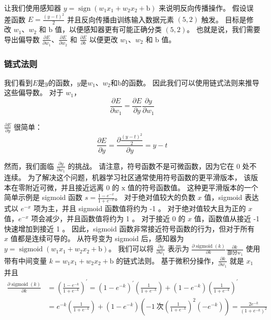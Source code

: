 让我们使用感知器 $y=\operatorname{sign}\left(w_{1} x_{1}+w_{2} x_{2}+\mathrm{b}\right)$ 来说明反向传播操作。 
假设误差函数 $E=\frac{(y-t)^{2}}{2}$ 并且反向传播由训练输入数据元素 $(5,2)$ 触发。 
目标是修改 $w_{1}、w_{2}$ 和 $\mathrm{b}$ 值，以便感知器更有可能正确分类 $(5,2)$。 
也就是说，我们需要导出偏导数 $\frac{\partial E}{\partial w_{1}}、\frac{\partial E}{\partial w_{2}}$ 
和 $\frac {\partial E}{\partial b}$ 以便更改 $w_{1}、w_{2}$ 和 $\mathrm{b}$ 值。

\subsubsection{链式法则}
我们看到$E$是$y$的函数，$y$是$w_{1}、w_{2}$和$\mathrm{b}$的函数。 因此我们可以使用链式法则来推导这些偏导数。 
对于 $w_{1}$，
$$
\frac{\partial E}{\partial w_{1}}=\frac{\partial E}{\partial y} \frac{\partial y}{\partial w_{1}}
$$

$\frac{\partial E}{\partial y}$ 很简单：
$$
\frac{\partial E}{\partial y}=\frac{\partial \frac{(y-t)^{2}}{2}}{\partial y}=y-t
$$

然而，我们面临 $\frac{\partial y}{\partial w_{1}}$ 的挑战。 请注意，符号函数不是可微函数，因为它在 0 处不连续。 
为了解决这个问题，机器学习社区通常使用符号函数的更平滑版本，
该版本在零附近可微，并且接近远离 0 的 $\mathrm{x}$ 值的符号函数值。 
这种更平滑版本的一个简单示例是 sigmoid 函数 $s=\frac{1-e^{-x}}{1+e^{-x}}$。 
对于绝对值较大的负数 $x$ 值，sigmoid 表达式以 $e^{-x}$ 项为主，并且 sigmoid 函数值将约为 -1 。 
对于绝对值较大且为正的 $x$ 值，$e^{-x}$ 项会减少，并且函数值将约为 1 。 
对于接近 0 的 $x$ 值，函数值从接近 -1 快速增加到接近 1 。 
因此，sigmoid 函数非常接近符号函数的行为，但对于所有 $x$ 值都是连续可导的。 
从符号变为 sigmoid 后，感知器为 $y=\operatorname{sigmoid}\left(w_{1} x_{1}+w_{2} x_{2}+\mathrm{b}\right)$。 
我们可以将 $\frac{\partial y}{\partial w_{1}}$ 表示为 $\frac{\partial \operatorname{sigmoid}(k)}{\partial k} \frac{\partial k}{\ 部分 w_{1}}$ 使用带有中间变量 $k=w_{1} x_{1}+w_{2} x_{2}+\mathrm{b}$ 的链式法则。 
基于微积分操作，$\frac{\partial k}{\partial w_{1}}$ 就是 $x_{1}$ 并且
$$
\begin{aligned}
\frac{\partial \operatorname{sigmoid}(k)}{\partial k} & =\left(\frac{1-e^{-k}}{1+e^{-k}}\right)^ {\prime}=\left(1-e^{-k}\right)^{\prime}\left(\frac{1}{1+e^{-k}}\right)+\left(1 -e^{-k}\right)\left(\frac{1}{1+e^{-k}}\right)^{\prime} \\
& =e^{-k}\left(\frac{1}{1+e^{-k}}\right)+\left(1-e^{-k}\right)\left(-1 \ 次\left(\frac{1}{1+e^{-k}}\right)^{2}\left(-e^{-k}\right)\right)=\frac{2 e^{ -k}}{\left(1+e^{-k}\right)^{2}}
\end{aligned}
$$

